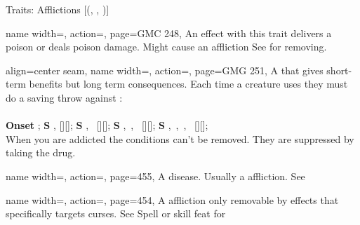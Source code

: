 \begin{PageFront}
\begin{Tables}{\frontTableHeight}
\begin{Table}{Traits: Afflictions }[{(, , )}]
            \begin{entry}{}{%
                name width=\conditionLength,%
                action=\Poison,
                page=GMC 248,
            }
                An effect with this trait delivers a poison or deals poison
                damage. Might cause an affliction \hfill See  for removing.
            \end{entry}
            \begin{entry}{}{%
                align=center seam,
                name width=\conditionLength,%
                action=\Drug,
                page=GMG 251,
            }
                A \Poison that gives short-term benefits but long term
                consequences. Each time a creature uses they must do a saving throw against :\\
                \newcommand{\Scaleing}{\scalefont{0.9}}
                \Fortitude[][before=Drug] 
                \hfill{}
                \\{\Scaleing
                \textbf{Onset} ;
                \hfill\textbf{S} \Fatigued, [][\Scaleing];
                \hfill\textbf{S} \Fatigued, \Sickened\, [][\Scaleing];
                \hfill\textbf{S} \Fatigued, \Drained\,, \Sickened\, [][\Scaleing];
                \hfill\textbf{S} \Fatigued, \Drained\,, \Sickened\,,
                    \Stupefied\, [][\Scaleing];}
                \\
                When you are addicted the conditions can't be removed. They are suppressed by taking the drug. \hfill
            \end{entry}
            \breakLine
            \begin{entry}{}{%
                name width=\conditionLength,%
                action=\Disease,
                page=455,
            }
                A disease. Usually a affliction. \hfill See 
            \end{entry}
            \breakLine
            \begin{entry}{}{%
                name width=\conditionLength,%
                action=\Curse,
                page=454,
            }
                A affliction only removable by effects that specifically
                targets curses. \hfill See Spell  or  skill feat for

\end{entry}
\end{Table}
\end{Tables}
\end{PageFront}
